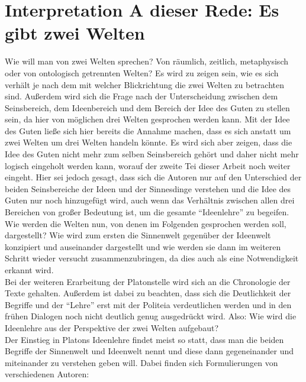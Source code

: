 \section{Interpretation A dieser Rede: Es gibt zwei Welten}
Wie will man von zwei Welten sprechen? Von räumlich, zeitlich, metaphysisch oder von ontologisch getrennten Welten? Es wird zu zeigen sein, wie es sich verhält je nach dem mit welcher Blickrichtung die zwei Welten zu betrachten sind. Außerdem wird sich die Frage nach der Unterscheidung zwischen dem Seinsbereich, dem Ideenbereich und dem Bereich der Idee des Guten zu stellen sein, da hier von möglichen drei Welten gesprochen werden kann. Mit der Idee des Guten ließe sich hier bereits die Annahme machen, dass es sich anstatt um zwei Welten um drei Welten handeln könnte. Es wird sich aber zeigen, dass die Idee des Guten nicht mehr zum selben Seinsbereich gehört und daher nicht mehr logisch eingeholt werden kann, worauf der zweite Tei dieser Arbeit noch weiter eingeht. Hier sei jedoch gesagt, dass sich die Autoren nur auf den Unterschied der beiden Seinsbereiche der Ideen und der Sinnesdinge verstehen und die Idee des Guten nur noch hinzugefügt wird, auch wenn das Verhältnis zwischen allen drei Bereichen von großer Bedeutung ist, um die gesamte \enquote{Ideenlehre} zu begeifen.\\
Wie werden die Welten nun, von denen im Folgenden gesprochen werden soll, dargestellt? Wie wird zum ersten die Sinnenwelt gegenüber der Ideenwelt konzipiert und auseinander dargestellt und wie werden sie dann im weiteren Schritt wieder versucht zusammenzubringen, da dies auch  als eine Notwendigkeit erkannt wird.\\
Bei der weiteren Erarbeitung der Platonstelle wird sich an die Chronologie der Texte gehalten. Außerdem ist dabei zu beachten, dass sich die Deutlichkeit der Begriffe und der \enquote{Lehre} erst mit der Politeia verdeutlichen werden und in den frühen Dialogen noch nicht deutlich genug ausgedrückt wird. 
Also: Wie wird die Ideenlehre aus der Perspektive der zwei Welten aufgebaut?\\
Der Einstieg in Platons Ideenlehre findet meist so statt, dass man die beiden Begriffe der Sinnenwelt und Ideenwelt nennt und diese dann gegeneinander und miteinander zu verstehen geben will. Dabei finden sich Formulierungen von verschiedenen Autoren: 
